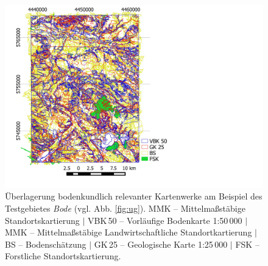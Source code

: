 \begin{figure}[t]
\centering\includegraphics[height=0.45\textheight]{figures/bode_data}
\caption[Überlagerung bodenkundlich relevanter Kartenwerke am Beispiel des Testgebietes \textit{Bode}.]{Überlagerung bodenkundlich relevanter Kartenwerke am Beispiel des Testgebietes \textit{Bode} (vgl. Abb. \ref{fig:ug}). MMK -- Mittelmaßstäbige Standortskartierung $|$ VBK\,50 -- Vorläufige Bodenkarte 1:50\,000 $|$ MMK -- Mittelmaßstäbige Landwirtschaftliche Standortkartierung $|$ BS -- Bodenschätzung $|$ GK\,25 -- Geologische Karte 1:25\,000 $|$ FSK -- Forstliche Standortskartierung.}\label{fig:soildata}
\end{figure}


